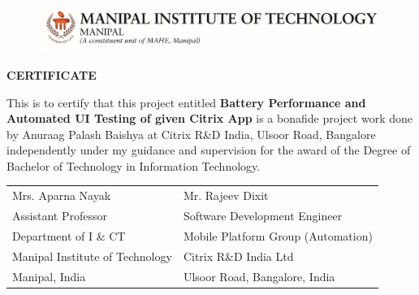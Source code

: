 \setlength\parindent{0pt}
\begin{figure}[bpht!]
	\begin{center}
		\includegraphics[scale=1]{MITLogo}
	\end{center}
\end{figure}
\begin{center}
	\large{\textbf{CERTIFICATE}}\\
\end{center}



This is to certify that this project entitled \textbf{Battery Performance and Automated UI Testing of given Citrix App} is a bonafide project work done by Anuraag Palash Baishya at Citrix R\&D India, Ulsoor Road, Bangalore independently under my guidance and supervision for the award of the Degree of Bachelor of Technology in Information Technology.



\vspace{4cm}

\begin{table}[h]
	\centering
		\begin{tabular}{p{3in} p{3in}}
			Mrs. Aparna Nayak &  Mr. Rajeev Dixit  \\
			Assistant Professor
 &    Software Development Engineer\\
			Department of I \& CT  &  Mobile Platform Group (Automation) \\
			 Manipal Institute of Technology& Citrix R\&D India Ltd \\
			Manipal, India &  Ulsoor Road, Bangalore, India 
		\end{tabular}
\end{table}
